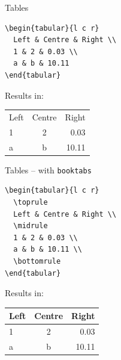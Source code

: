 \documentclass[t]{beamer}
\begin{document}
\begin{frame}[fragile]{Tables}
  \begin{verbatim}
\begin{tabular}{l c r}
  Left & Centre & Right \\
  1 & 2 & 0.03 \\
  a & b & 10.11
\end{tabular}
  \end{verbatim}

  Results in:

  \begin{center}
    \begin{tabular}{l c r}
      Left & Centre & Right \\
      1 & 2 & 0.03 \\
      a & b & 10.11
    \end{tabular}
  \end{center}
\end{frame}

\begin{frame}{Tables -- with \texttt{booktabs}}
  \begin{verbatim}
\begin{tabular}{l c r}
  \toprule
  Left & Centre & Right \\
  \midrule
  1 & 2 & 0.03 \\
  a & b & 10.11 \\
  \bottomrule
\end{tabular}
  \end{verbatim}

  Results in:

  \begin{center}
    \begin{tabular}{l c r}
      \toprule
      Left & Centre & Right \\
      \midrule
      1 & 2 & 0.03 \\
      a & b & 10.11 \\
      \bottomrule
    \end{tabular}
  \end{center}
\end{frame}
\end{document}
